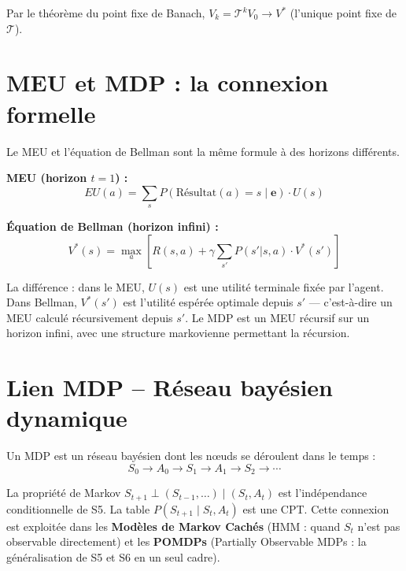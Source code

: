 \documentclass[11pt,a4paper]{article}
\begin{document}
Par le théorème du point fixe de Banach, $V_k = \mathcal{T}^k V_0 \to V^*$ (l'unique point fixe de $\mathcal{T}$).

\section{MEU et MDP : la connexion formelle}

Le MEU et l'équation de Bellman sont la même formule à des horizons différents.

\textbf{MEU (horizon $t=1$) :}
$$EU(a) = \sum_{s} P(\text{Résultat}(a)=s \mid \mathbf{e}) \cdot U(s)$$

\textbf{Équation de Bellman (horizon infini) :}
$$V^*(s) = \max_a \left[ R(s,a) + \gamma \sum_{s'} P(s'|s,a) \cdot V^*(s') \right]$$

La différence : dans le MEU, $U(s)$ est une utilité terminale fixée par l'agent. Dans Bellman, $V^*(s')$ est l'utilité espérée optimale depuis $s'$ --- c'est-à-dire un MEU calculé récursivement depuis $s'$. Le MDP est un MEU récursif sur un horizon infini, avec une structure markovienne permettant la récursion.

\section{Lien MDP -- Réseau bayésien dynamique}

Un MDP est un réseau bayésien dont les nœuds se déroulent dans le temps :
$$S_0 \to A_0 \to S_1 \to A_1 \to S_2 \to \cdots$$

La propriété de Markov $S_{t+1} \perp (S_{t-1},\ldots) \mid (S_t, A_t)$ est l'indépendance conditionnelle de S5. La table $P(S_{t+1} \mid S_t, A_t)$ est une CPT. Cette connexion est exploitée dans les \textbf{Modèles de Markov Cachés} (HMM : quand $S_t$ n'est pas observable directement) et les \textbf{POMDPs} (Partially Observable MDPs : la généralisation de S5 et S6 en un seul cadre).
\end{document}
